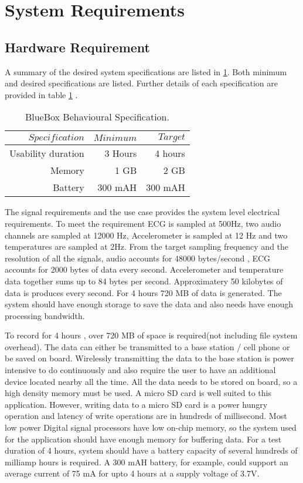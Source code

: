 \section{System Requirements}\label{system requirements}
\subsection{Hardware Requirement}

\hspace{10mm}A summary of the desired system specifications are listed in \ref{table:Behavioural_specs}. Both minimum and desired specifications are listed. Further details of each specification are provided in table \ref{table:Behavioural_specs} .
\begin{table}[h]
	\centering
	\begin{tabular}{|r |r|r|}
		\hline
		$Specification$ & $Minimum$ & $Target$ \\
		\hline
		Usability duration  &  3 Hours & 4 hours \\
		Memory & 1 GB & 2 GB \\
		Battery & 300 mAH & 300 mAH \\
		\hline
	\end{tabular}
	\caption{BlueBox Behavioural Specification.}
	\label{table:Behavioural_specs}
\end{table}

The signal requirements and the use case  provides the system level electrical requirements.  To meet the requirement ECG is sampled at 500Hz, two audio channels are sampled at 12000 Hz, Accelerometer is sampled at 12 Hz and two temperatures are sampled at 2Hz. From the target sampling frequency and the resolution of all the signals, audio accounts for 48000 bytes/second , ECG accounts for 2000 bytes of data every second. Accelerometer and temperature data together sums up to 84 bytes per second. Approximatery 50 kilobytes of data is produces every second. For 4 hours 720 MB of data is generated. The system should have enough storage to save the data and also needs have enough processing bandwidth. 

\hspace{10mm} To record for 4 hours , over 720 MB of space is required(not including file system overhead). The data can either be transmitted to a base station / cell phone or be saved on board. Wirelessly transmitting the data to the base station is power intensive to do continuously and also require the user to have an additional device located nearby all the time. 
All the data needs to be stored on board, so a high density memory must be used. A micro SD card is well suited to this application. However, writing data to a micro SD card is a power hungry operation and latency of write operations are in hundreds of millisecond. Most low power Digital signal processors have low on-chip memory, so the system used for the application should have enough memory for buffering data. For a test duration of 4 hours, system should have a battery capacity of several hundreds of milliamp hours is required. A 300 mAH battery, for example, could support an average current of 75 mA for upto 4 hours at a supply voltage of 3.7V. 

